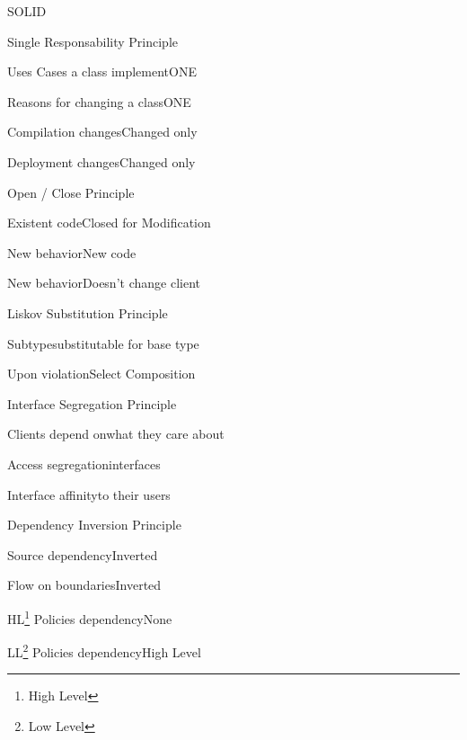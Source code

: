 




\begin{task}{SOLID}

  \begin{checklist}{Single Responsability Principle}
    \item{Uses Cases a class implement}{ONE}
    \item{Reasons for changing a class}{ONE}
    \item{Compilation changes}{Changed only}
    \item{Deployment changes}{Changed only}
  \end{checklist}

  \begin{checklist}{Open / Close Principle}
    \item{Existent code}{Closed for Modification}
    \item{New behavior}{New code}
    \item{New behavior}{Doesn't change client}
  \end{checklist}

  \begin{checklist}{Liskov Substitution Principle}
    \item{Subtype}{substitutable for base type}
    \item{Upon violation}{Select Composition}
  \end{checklist}

  \begin{checklist}{Interface Segregation Principle}
    \item{Clients depend on}{what they care about}
    \item{Access segregation}{interfaces}
    \item{Interface affinity}{to their users}
  \end{checklist}

  \begin{checklist}{Dependency Inversion Principle}
    \item{Source dependency}{Inverted}
    \item{Flow on boundaries}{Inverted}
    \item{HL\footnote{High Level} Policies dependency}{None}
    \item{LL\footnote{Low Level} Policies  dependency}{High Level}
  \end{checklist}

\end{task}


